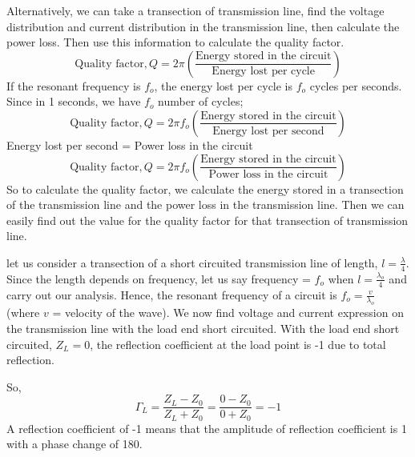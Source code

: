 Alternatively, we can take a transection of transmission line, find the voltage distribution and current distribution in the transmission line, then calculate the power loss. Then use this information to calculate the quality factor.
\begin{dmath*}
\text{Quality factor},Q 
=2\pi\left(\frac{\text{Energy stored in the circuit}}{\text{Energy lost per cycle}}\right) 
\end{dmath*} 
If the resonant frequency is $ f_{o} $, the energy lost per cycle is $ f_{o} $ cycles per seconds. Since in 1 seconds, we have $ f_{o} $ number of cycles;
\begin{dmath*}
\text{Quality factor}, Q = 2\pi f_{o}\left(\frac{\text{Energy stored in the circuit}}{\text{Energy lost per second}}\right)
\end{dmath*}
Energy lost per second = Power loss in the circuit 
\begin{dmath*}
\text{Quality factor}, Q=2 \pi f_{o}\left(\frac{\text{Energy stored in the circuit}}{\text{Power loss in the circuit}}\right)
\end{dmath*}
So to calculate the quality factor, we calculate the energy stored in a transection of the transmission line and the power loss in the transmission line. Then we can easily find out the value for the quality factor for that transection of transmission line.

let us consider a transection of a short circuited transmission line of length, $ l=\frac{\lambda}{4} $. Since the length depends on frequency, let us say frequency = $ f_{o} $ when $ l=\frac{\lambda_{o}}{4}$ and carry out our analysis. Hence, the resonant frequency of a circuit is $ f_{o} =\frac{v}{\lambda_{o}}$ (where $v$ = velocity of the wave). We now find voltage and current expression on the transmission line with the load end short circuited. With the load end short circuited, $Z_{L}= 0$, the reflection coefficient at the load point is -1 due to total reflection.

So,
\[\Gamma_{L} = \frac{Z_{L} - Z_0}{Z_{L} + Z_0} = \frac{0 - Z_0}{0 + Z_0} = -1\]
A reflection coefficient of -1 means that the amplitude of reflection coefficient is 1 with a phase change of 180\textdegree.

